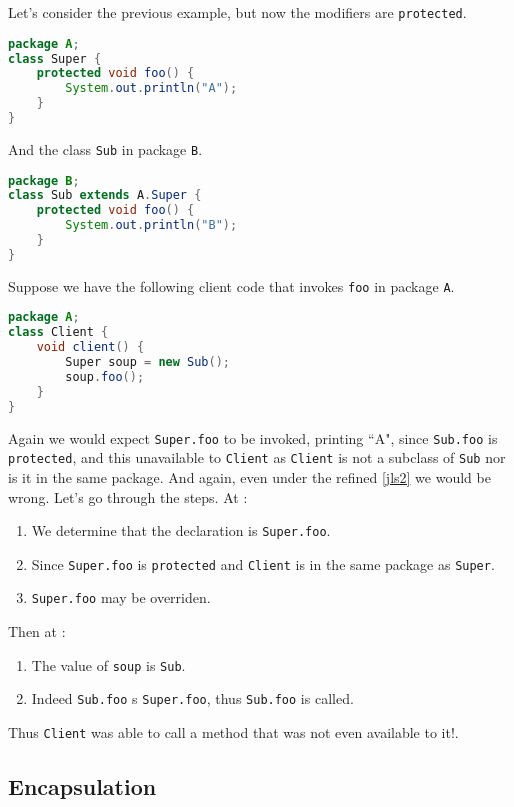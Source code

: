\documentclass{article}
\begin{document}
\begin{example}
Let's consider the previous example, but now the modifiers are \texttt{protected}.
\begin{lstlisting}[escapechar=|, language=Java]
package A;
class Super {
    protected void foo() {
        System.out.println("A");
    }
}
\end{lstlisting}
And the class \texttt{Sub} in package \texttt{B}.
\begin{lstlisting}[escapechar=|, language=Java]
package B;
class Sub extends A.Super {
    protected void foo() {
        System.out.println("B");
    }
}
\end{lstlisting}
Suppose we have the following client code that invokes \texttt{foo} in package \texttt{A}.
\begin{lstlisting}[escapechar=|, language = Java]
package A;
class Client {
    void client() {
        Super soup = new Sub();
        soup.foo();
    }
}
\end{lstlisting}
Again we would expect \texttt{Super.foo} to be invoked, printing ``A", since \texttt{Sub.foo} is \texttt{protected}, and this unavailable to \texttt{Client} as \texttt{Client} is not a subclass of \texttt{Sub} nor is it in the same package.
And again, even under the refined \ref{jls2} we would be wrong.
Let's go through the steps.
At \compiletime{}:
\begin{enumerate}
\item We determine that the \static{} declaration is \texttt{Super.foo}.
\item Since \texttt{Super.foo} is \texttt{protected} and \texttt{Client} is in the same package as \texttt{Super}.
\item \texttt{Super.foo} may be overriden.
\end{enumerate}
Then at \runtime{}:
\begin{enumerate}
\item The \dynamic{} value of \texttt{soup} is \texttt{Sub}.
\item Indeed \texttt{Sub.foo} \override{}s \texttt{Super.foo}, thus \texttt{Sub.foo} is called.
\end{enumerate}
Thus \texttt{Client} was able to call a method that was not even available to it!.
\end{example}

\subsection{Encapsulation}
\end{document}
